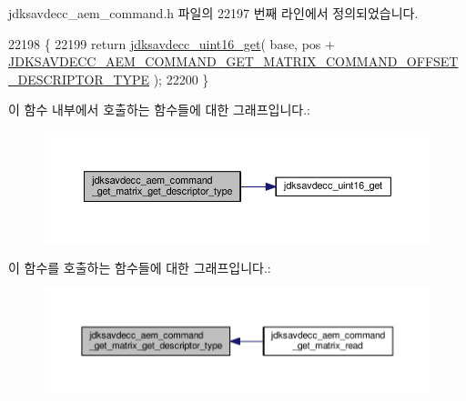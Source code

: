 jdksavdecc\+\_\+aem\+\_\+command.\+h 파일의 22197 번째 라인에서 정의되었습니다.


\begin{DoxyCode}
22198 \{
22199     \textcolor{keywordflow}{return} \hyperlink{group__endian_ga3fbbbc20be954aa61e039872965b0dc9}{jdksavdecc\_uint16\_get}( base, pos + 
      \hyperlink{group__command__get__matrix_ga35cb9cda25238f6143b6fea0d8f0d553}{JDKSAVDECC\_AEM\_COMMAND\_GET\_MATRIX\_COMMAND\_OFFSET\_DESCRIPTOR\_TYPE}
       );
22200 \}
\end{DoxyCode}


이 함수 내부에서 호출하는 함수들에 대한 그래프입니다.\+:
\nopagebreak
\begin{figure}[H]
\begin{center}
\leavevmode
\includegraphics[width=350pt]{group__command__get__matrix_gadecbe0ab8669b005acd23a62a0d4d077_cgraph}
\end{center}
\end{figure}




이 함수를 호출하는 함수들에 대한 그래프입니다.\+:
\nopagebreak
\begin{figure}[H]
\begin{center}
\leavevmode
\includegraphics[width=350pt]{group__command__get__matrix_gadecbe0ab8669b005acd23a62a0d4d077_icgraph}
\end{center}
\end{figure}


